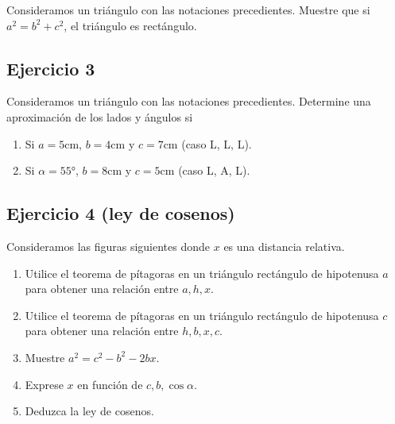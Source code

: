 Consideramos un triángulo con las notaciones precedientes.
Muestre que si $a^2 = b^2 + c^2$, el triángulo es rectángulo.

\subsection{Ejercicio 3}

Consideramos un triángulo con las notaciones precedientes. Determine una
aproximación de los lados y ángulos si

\begin{enumerate}
  \item Si $a=5\text{cm}$, $b=4\text{cm}$ y $c=7\text{cm}$ (caso L, L, L).
  \item Si $\alpha=55°$, $b=8\text{cm}$ y $c=5\text{cm}$ (caso L, A, L).
\end{enumerate}

\subsection{Ejercicio 4 (ley de cosenos)}

Consideramos las figuras siguientes donde $x$ es una distancia relativa.

\begin{center}
\end{center}

\begin{enumerate}
\item Utilice el teorema de pítagoras en un triángulo rectángulo de hipotenusa
  $a$ para obtener una relación entre $a,h,x$.
\item Utilice el teorema de pítagoras en un triángulo rectángulo de hipotenusa
  $c$ para obtener una relación entre $h,b,x,c$.
\item Muestre $a^2 = c^2 - b^2 - {2bx}$.
\item Exprese $x$ en función de $c, b, \cos{\alpha}$.
\item Deduzca la ley de cosenos.
\end{enumerate}

